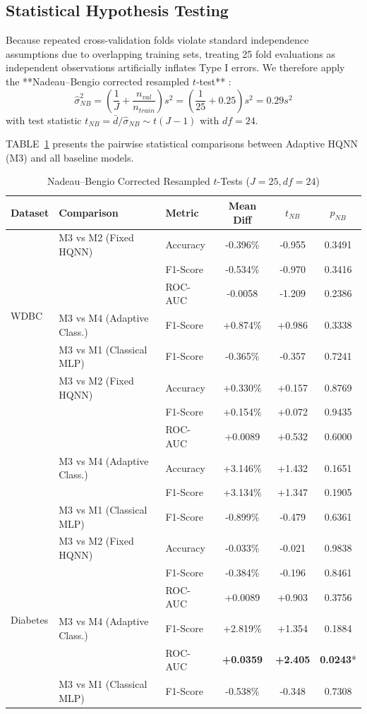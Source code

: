 \documentclass[conference]{IEEEtran}
\begin{document}
\subsection{Statistical Hypothesis Testing}
Because repeated cross-validation folds violate standard independence assumptions due to overlapping training sets, treating 25 fold evaluations as independent observations artificially inflates Type I errors. We therefore apply the **Nadeau--Bengio corrected resampled $t$-test** \cite{nadeau2003inference}:
\begin{equation}
\hat{\sigma}^2_{NB} = \left(\frac{1}{J} + \frac{n_{val}}{n_{train}}\right) s^2 = \left(\frac{1}{25} + 0.25\right) s^2 = 0.29 s^2
\end{equation}
with test statistic $t_{NB} = \bar{d} / \hat{\sigma}_{NB} \sim t(J-1)$ with $df = 24$.

TABLE~\ref{tab:statistics} presents the pairwise statistical comparisons between Adaptive HQNN (M3) and all baseline models.

\begin{table}[htbp]
\caption{Nadeau--Bengio Corrected Resampled $t$-Tests ($J=25, df=24$)}
\label{tab:statistics}
\centering
\begin{tabular}{lllccc}
\toprule
Dataset & Comparison & Metric & Mean Diff & $t_{NB}$ & $p_{NB}$ \\
\midrule
\multirow{6}{*}{WDBC} 
& M3 vs M2 (Fixed HQNN) & Accuracy & -0.396\% & -0.955 & 0.3491 \\
& & F1-Score & -0.534\% & -0.970 & 0.3416 \\
& & ROC-AUC & -0.0058 & -1.209 & 0.2386 \\
& M3 vs M4 (Adaptive Class.) & F1-Score & +0.874\% & +0.986 & 0.3338 \\
& M3 vs M1 (Classical MLP) & F1-Score & -0.365\% & -0.357 & 0.7241 \\
\midrule
\multirow{6}{*}{Heart} 
& M3 vs M2 (Fixed HQNN) & Accuracy & +0.330\% & +0.157 & 0.8769 \\
& & F1-Score & +0.154\% & +0.072 & 0.9435 \\
& & ROC-AUC & +0.0089 & +0.532 & 0.6000 \\
& M3 vs M4 (Adaptive Class.) & Accuracy & +3.146\% & +1.432 & 0.1651 \\
& & F1-Score & +3.134\% & +1.347 & 0.1905 \\
& M3 vs M1 (Classical MLP) & F1-Score & -0.899\% & -0.479 & 0.6361 \\
\midrule
\multirow{6}{*}{Diabetes} 
& M3 vs M2 (Fixed HQNN) & Accuracy & -0.033\% & -0.021 & 0.9838 \\
& & F1-Score & -0.384\% & -0.196 & 0.8461 \\
& & ROC-AUC & +0.0089 & +0.903 & 0.3756 \\
& M3 vs M4 (Adaptive Class.) & F1-Score & +2.819\% & +1.354 & 0.1884 \\
& & ROC-AUC & \textbf{+0.0359} & \textbf{+2.405} & \textbf{0.0243}* \\
& M3 vs M1 (Classical MLP) & F1-Score & -0.538\% & -0.348 & 0.7308 \\
\bottomrule
\end{tabular}
\end{table}
\end{document}
